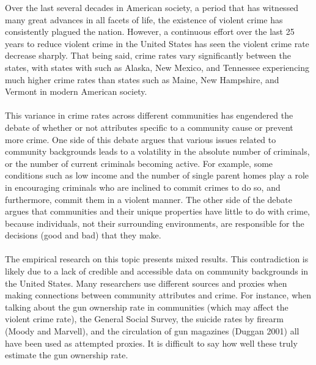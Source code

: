 \documentclass[letterpaper, 11 pt, conference]{article}
\begin{document}
Over the last several decades in American society, a period that has witnessed many great advances in all facets of life, the existence of violent crime has consistently plagued the nation. However, a continuous effort over the last 25 years to reduce violent crime in the United States has seen the violent crime rate decrease sharply. That being said, crime rates vary significantly between the states, with states with such as Alaska, New Mexico, and Tennessee experiencing much higher crime rates than states such as Maine, New Hampshire, and Vermont in modern American society.
\\
\\This variance in crime rates across different communities has engendered the debate of whether or not attributes specific to a community cause or prevent more crime. One side of this debate argues that various issues related to community backgrounds leads to a volatility in the absolute number of criminals, or the number of current criminals becoming active. For example, some conditions such as low income and the number of single parent homes play a role in encouraging criminals who are inclined to commit crimes to do so, and furthermore, commit them in a violent manner. The other side of the debate argues that communities and their unique properties have little to do with crime, because individuals, not their surrounding environments, are responsible for the decisions (good and bad) that they make.
\\
\\The empirical research on this topic presents mixed results. This contradiction is likely due to a lack of credible and accessible data on community backgrounds in the United States. Many researchers use different sources and proxies when making connections between community attributes and crime. For instance, when talking about the gun ownership rate in communities (which may affect the violent crime rate), the General Social Survey, the suicide rates by firearm (Moody and Marvell), and the circulation of gun magazines (Duggan 2001) all have been used as attempted proxies. It is difficult to say how well these truly estimate the gun ownership rate.
\\
\end{document}
